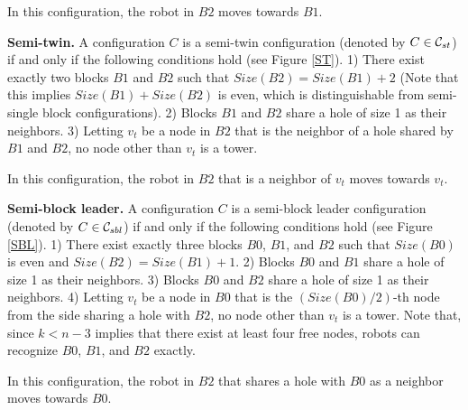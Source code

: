 \documentclass[11pt]{article}
\newcommand{\CONF}{{\cal C}}
\begin{document}
\begin{itemize*}
In this configuration, the robot in $B2$ moves towards $B1$.

\item {\bf Semi-twin.} A configuration $C$ is a semi-twin configuration (denoted by $C\in\CONF_{st}$) if and only if the following conditions hold (see Figure \ref{ST}). 1) There exist exactly two blocks $B1$ and $B2$ such that $Size(B2)=Size(B1)+2$ (Note that this implies $Size(B1)+Size(B2)$ is even, which is distinguishable from semi-single block configurations). 2) Blocks $B1$ and $B2$ share a hole of size 1 as their neighbors. 3) Letting $v_t$ be a node in $B2$ that is the neighbor of a hole shared by $B1$ and $B2$, no node other than $v_t$ is a tower.

In this configuration, the robot in $B2$ that is a neighbor of $v_t$ moves towards $v_t$.

\item {\bf Semi-block leader.} A configuration $C$ is a semi-block leader configuration (denoted by $C\in\CONF_{sbl}$) if and only if the following conditions hold (see Figure \ref{SBL}). 1) There exist exactly three blocks $B0$, $B1$, and $B2$ such that $Size(B0)$ is even and $Size(B2)=Size(B1)+1$. 2) Blocks $B0$ and $B1$ share a hole of size 1 as their neighbors. 3) Blocks $B0$ and $B2$ share a hole of size 1 as their neighbors. 4) Letting $v_t$ be a node in $B0$ that is the $(Size(B0)/2)$-th node from the side sharing a hole with $B2$, no node other than $v_t$ is a tower. Note that, since $k<n-3$ implies that there exist at least four free nodes, robots can recognize $B0$, $B1$, and $B2$ exactly.

In this configuration, the robot in $B2$ that shares a hole with $B0$ as a neighbor moves towards $B0$.
\end{itemize*}
\end{document}
